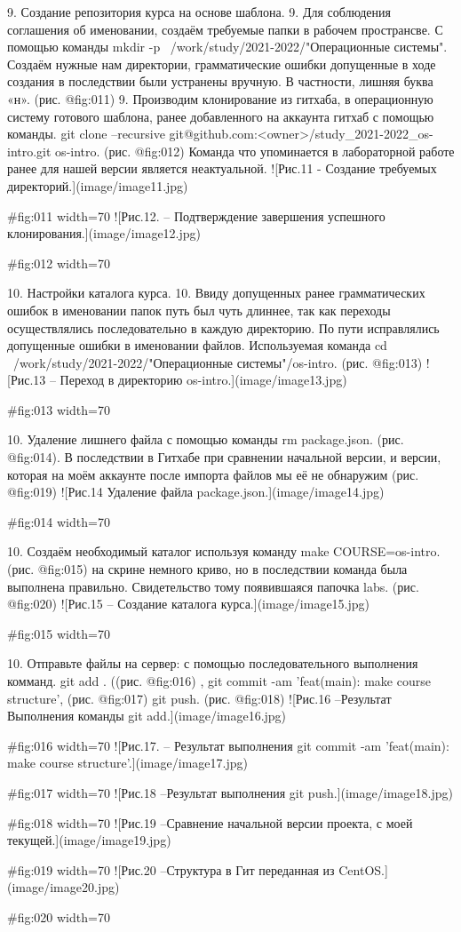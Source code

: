 {{{{{{{{{{9. Создание репозитория курса на основе шаблона.
 9. Для соблюдения соглашения об именовании, создаём требуемые папки в рабочем пространсве. С помощью команды mkdir -p ~/work/study/2021-2022/"Операционные системы". Создаём нужные нам директории, грамматические ошибки допущенные в ходе создания в последствии были устранены вручную. В частности, лишняя буква «н». (рис. @fig:011) 
 9. Производим клонирование из гитхаба, в операционную систему готового шаблона, ранее добавленного на аккаунта гитхаб с помощью команды. git clone –recursive git@github.com:<owner>/study_2021-2022_os-intro.git os-intro. (рис. @fig:012) 
Команда что упоминается в лабораторной работе ранее для нашей версии является неактуальной.
![Рис.11 - Создание требуемых директорий.](image/image11.jpg){#fig:011 width=70%
![Рис.12. – Подтверждение завершения успешного клонирования.](image/image12.jpg){#fig:012 width=70%
 

10. Настройки каталога курса.
 10. Ввиду допущенных ранее грамматических ошибок в именовании папок путь был чуть длиннее, так как переходы осуществлялись последовательно в каждую директорию. По пути исправлялись допущенные ошибки в именовании файлов. Используемая команда cd ~/work/study/2021-2022/"Операционные системы"/os-intro. (рис. @fig:013)
![Рис.13 – Переход в директорию os-intro.](image/image13.jpg){#fig:013 width=70%
 
 10. Удаление лишнего файла с помощью команды rm package.json. (рис. @fig:014). В последствии в Гитхабе при сравнении начальной версии, и версии, которая на моём аккаунте после импорта файлов мы её не обнаружим (рис. @fig:019)
![Рис.14 Удаление файла package.json.](image/image14.jpg){#fig:014 width=70%

 10. Создаём необходимый каталог используя команду  make COURSE=os-intro. (рис. @fig:015) на скрине немного криво, но в последствии команда была выполнена правильно. Свидетельство тому появившаяся папочка labs. (рис. @fig:020)
![Рис.15 – Создание каталога курса.](image/image15.jpg){#fig:015 width=70%

 10. Отправьте файлы на сервер: с помощью последовательного выполнения комманд. git add . ((рис. @fig:016) ,  git commit -am 'feat(main): make course structure', (рис. @fig:017) git push. (рис. @fig:018)
![Рис.16 –Результат Выполнения команды git add.](image/image16.jpg){#fig:016 width=70%
![Рис.17. – Результат выполнения git commit -am 'feat(main): make course structure'.](image/image17.jpg){#fig:017 width=70%
![Рис.18 –Результат выполнения git push.](image/image18.jpg){#fig:018 width=70%
![Рис.19 –Сравнение начальной версии проекта, с моей текущей.](image/image19.jpg){#fig:019 width=70%
![Рис.20 –Структура в Гит переданная из CentOS.](image/image20.jpg){#fig:020 width=70%
 
}}}}}}}}}}}}}}}}}}}}
